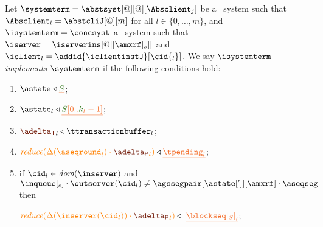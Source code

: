 \begin{definition} \label{def:implementation}
Let  $\systemterm = \abstsyst[@][@][\Absclient_j]$ be a \tgspcalculus\ system
 such that $\Absclient_l={\abstcliJ[@][m]}$ for all
$l\in\{0,\ldots,m\}$, and  $\isystemterm = \concsyst$  a \igsp\  system such that  $\iserver = \iserverins[@][\amxrf[_s]]$ and $\iclient_l = \addid{\iclientinstJ}[{\cid{_l}}]$.
 We say {\em $\isystemterm$ implements $\systemterm$} if the following conditions hold:

\begin{enumerate}
	\item \label{prop_stateserver} $\astate \triangleleft \flatten{\queuemessage}$;

	\item \label{prop_state_known} $\astate_l \triangleleft \flatten {\queuemessage[0 .. \tknown_l - 1]}$;
	
	\item \label{prop_transactions} ${\transactionbuffer}_l\triangleleft{\ttransactionbuffer}_l$;
	
	\item \label{prop_pending}  
		$\ireduce{\igetdeltas{\pending_l}\cdot {\pushbuffer}_l} \triangleleft \flatten{\tpending_l}$;


	\item \label{prop_sent}  
	   
	   if $\cid_l \in \dom\inserver$ and $\inclient \cdot\outserver(\cid_l) \neq \agssegpair[{\astate[']}][{\amxrf}]\cdot\aseqseg$ %
	   then 
	   
	   $ \ireduce{\igetdeltas{\inserver(\cid_l)}\cdot {\pushbuffer}_l} \triangleleft \ \flatten{{\tsent}_l}$;
	 


\end{enumerate}
\end{definition}

